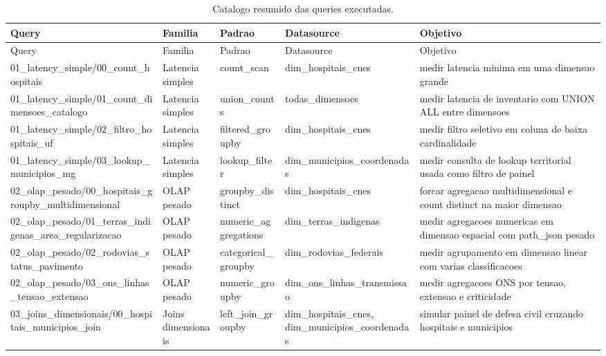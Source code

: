 \begin{landscape}
{
\scriptsize
\setlength{\tabcolsep}{4pt}
\renewcommand{\arraystretch}{1.15}
\begin{longtable}{p{}p{}p{}p{}p{}}
\caption{Catalogo resumido das queries executadas.}\\
\toprule
Query & Familia & Padrao & Datasource & Objetivo \\
\midrule
\endfirsthead
\toprule
Query & Familia & Padrao & Datasource & Objetivo \\
\midrule
\endhead
01\_latency\_simple/00\_count\_hospitais & Latencia simples & count\_scan & dim\_hospitais\_cnes & medir latencia minima em uma dimensao grande \\
01\_latency\_simple/01\_count\_dimensoes\_catalogo & Latencia simples & union\_counts & todas\_dimensoes & medir latencia de inventario com UNION ALL entre dimensoes \\
01\_latency\_simple/02\_filtro\_hospitais\_uf & Latencia simples & filtered\_groupby & dim\_hospitais\_cnes & medir filtro seletivo em coluna de baixa cardinalidade \\
01\_latency\_simple/03\_lookup\_municipios\_mg & Latencia simples & lookup\_filter & dim\_municipios\_coordenadas & medir consulta de lookup territorial usada como filtro de painel \\
02\_olap\_pesado/00\_hospitais\_groupby\_multidimensional & OLAP pesado & groupby\_distinct & dim\_hospitais\_cnes & forcar agregacao multidimensional e count distinct na maior dimensao \\
02\_olap\_pesado/01\_terras\_indigenas\_area\_regularizacao & OLAP pesado & numeric\_aggregations & dim\_terras\_indigenas & medir agregacoes numericas em dimensao espacial com path\_json pesado \\
02\_olap\_pesado/02\_rodovias\_status\_pavimento & OLAP pesado & categorical\_groupby & dim\_rodovias\_federais & medir agrupamento em dimensao linear com varias classificacoes \\
02\_olap\_pesado/03\_ons\_linhas\_tensao\_extensao & OLAP pesado & numeric\_groupby & dim\_ons\_linhas\_transmissao & medir agregacoes ONS por tensao, extensao e criticidade \\
03\_joins\_dimensionais/00\_hospitais\_municipios\_join & Joins dimensionais & left\_join\_groupby & dim\_hospitais\_cnes, dim\_municipios\_coordenadas & simular painel de defesa civil cruzando hospitais e municipios \\

\end{longtable}}
\end{landscape}
